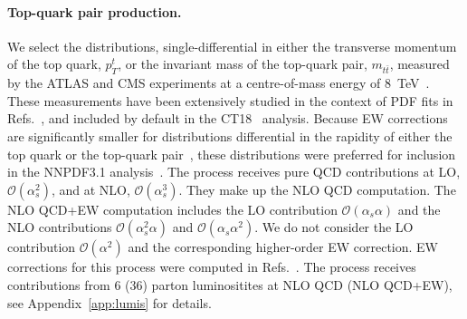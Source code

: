 \paragraph{Top-quark pair production.}
We select the distributions, single-differential in either the transverse
momentum of the top quark, $p_T^t$, or the invariant mass of the top-quark
pair, $m_{t\bar t}$, measured by the ATLAS and CMS experiments at a centre-of-mass
energy of 8~TeV~\cite{Aad:2015mbv,Khachatryan:2015oqa}. These measurements have
been extensively studied in the context of PDF fits in
Refs.~\cite{Czakon:2016olj,Bailey:2019yze,Amoroso:2020lgh,Kadir:2020yml}, and
included by default in the CT18~\cite{Hou:2019efy} analysis.
Because EW corrections are significantly smaller for distributions differential
in the rapidity of either the top quark or the top-quark
pair~\cite{Czakon:2017wor}, these distributions were preferred for inclusion
in the NNPDF3.1 analysis~\cite{Ball:2017nwa}. The process receives
pure QCD contributions at LO, $\mathcal{O}(\alpha_s^2)$, and
at NLO, $\mathcal{O}(\alpha_s^3)$. They make up the NLO QCD
computation. The NLO QCD+EW computation includes the LO contribution
$\mathcal{O}(\alpha_s\alpha)$ and the NLO contributions
$\mathcal{O}(\alpha_s^2\alpha)$ and $\mathcal{O}(\alpha_s\alpha^2)$.
We do not consider the LO contribution $\mathcal{O}(\alpha^2)$ and the
corresponding higher-order EW correction. EW corrections for this process
were computed in Refs.~\cite{Bernreuther:2010ny,Hollik:2011ps,Kuhn:2011ri,Bernreuther:2012sx,Pagani:2016caq,Czakon:2017wor,Czakon:2017lgo,Czakon:2017mmr,Czakon:2019bcq,Czakon:2019txp}. The process receives contributions from
6 (36) parton luminositites at NLO QCD (NLO QCD+EW), 
see Appendix~\ref{app:lumis} for details.


